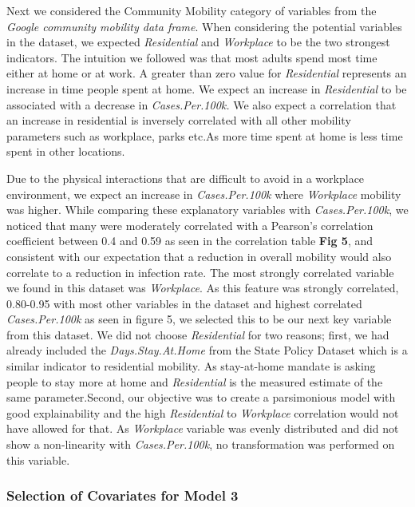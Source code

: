 \documentclass[
]{article}
\begin{document}
Next we considered the Community Mobility category of variables from the
\emph{Google community mobility data frame}. When considering the
potential variables in the dataset, we expected \emph{Residential} and
\emph{Workplace} to be the two strongest indicators. The intuition we
followed was that most adults spend most time either at home or at work.
A greater than zero value for \emph{Residential} represents an increase
in time people spent at home. We expect an increase in
\emph{Residential} to be associated with a decrease in
\emph{Cases.Per.100k.} We also expect a correlation that an increase in
residential is inversely correlated with all other mobility parameters
such as workplace, parks etc.As more time spent at home is less time
spent in other locations.

Due to the physical interactions that are difficult to avoid in a
workplace environment, we expect an increase in \emph{Cases.Per.100k}
where \emph{Workplace} mobility was higher. While comparing these
explanatory variables with \emph{Cases.Per.100k}, we noticed that many
were moderately correlated with a Pearson's correlation coefficient
between 0.4 and 0.59 as seen in the correlation table \textbf{Fig 5},
and consistent with our expectation that a reduction in overall mobility
would also correlate to a reduction in infection rate. The most strongly
correlated variable we found in this dataset was \emph{Workplace}. As
this feature was strongly correlated, 0.80-0.95 with most other
variables in the dataset and highest correlated \emph{Cases.Per.100k} as
seen in figure 5, we selected this to be our next key variable from this
dataset. We did not choose \emph{Residential} for two reasons; first, we
had already included the \emph{Days.Stay.At.Home} from the State Policy
Dataset which is a similar indicator to residential mobility. As
stay-at-home mandate is asking people to stay more at home and
\emph{Residential} is the measured estimate of the same
parameter.Second, our objective was to create a parsimonious model with
good explainability and the high \emph{Residential} to \emph{Workplace}
correlation would not have allowed for that. As \emph{Workplace}
variable was evenly distributed and did not show a non-linearity with
\emph{Cases.Per.100k}, no transformation was performed on this variable.

\hypertarget{selection-of-covariates-for-model-3}{%
\subsubsection{Selection of Covariates for Model
3}\label{selection-of-covariates-for-model-3}}
\end{document}
